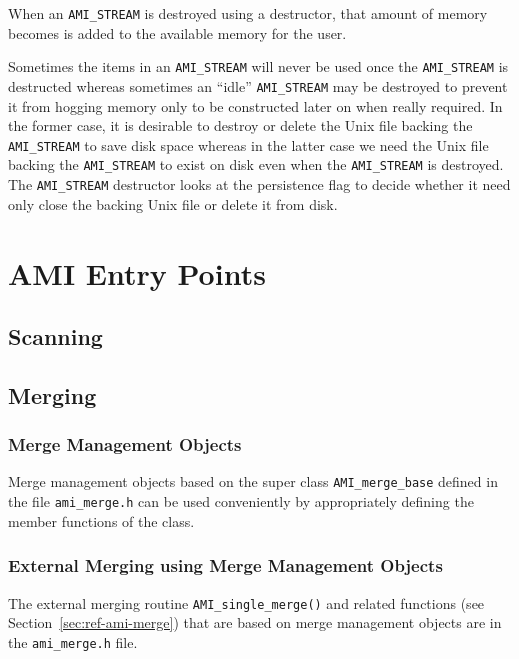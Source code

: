 When an \verb|AMI_STREAM| is destroyed using a destructor, that
amount of memory becomes is added to the available memory for the
user. 


Sometimes the
items in an \verb|AMI_STREAM| will never be used  once the \verb|AMI_STREAM| is
destructed whereas sometimes an ``idle'' \verb|AMI_STREAM| may be destroyed 
to prevent it from hogging memory only to be constructed later on
when really required. In the former case, it is desirable to 
destroy or delete the Unix file backing the \verb|AMI_STREAM| to save
disk space whereas in the latter case we need the Unix file backing
the \verb|AMI_STREAM| to exist on disk even when the \verb|AMI_STREAM| is
destroyed. The  \verb|AMI_STREAM| destructor looks at the persistence 
flag to decide whether it need only close the backing Unix file or
delete it from disk.




\section{AMI Entry Points}
\label{sec:ref-entry}

\subsection{Scanning}
\label{sec:ref-imp-ami-scan}


\subsection{Merging}
\label{sec:ref-imp-ami-merge}

\subsubsection{Merge Management Objects}
Merge management objects based on the super class \verb|AMI_merge_base| 
defined in the file \verb|ami_merge.h| can be used conveniently by
appropriately defining the member functions of the class.

\subsubsection{External Merging using Merge Management Objects}
The external merging routine \verb|AMI_single_merge()|
and related functions (see Section~\ref{sec:ref-ami-merge}) 
that are based on merge management objects are in the \verb|ami_merge.h| file.

